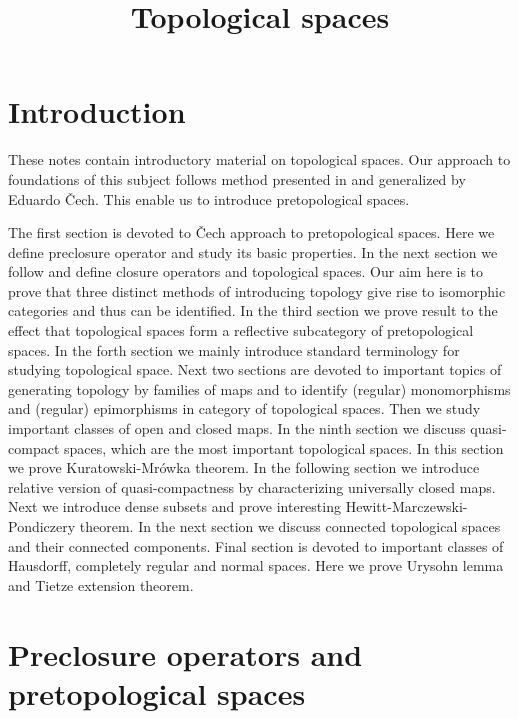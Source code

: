 



\title{Topological spaces}
\date{}
\maketitle

\section{Introduction}
\noindent
These notes contain introductory material on topological spaces. Our approach to foundations of this subject follows method presented in \cite{kuratowski1922operation} and generalized by Eduardo \v{C}ech. This enable us to introduce pretopological spaces.

The first section is devoted to \v{C}ech approach to pretopological spaces. Here we define preclosure operator and study its basic properties. In the next section we follow \cite{kuratowski1922operation} and define closure operators and topological spaces. Our aim here is to prove that three distinct methods of introducing topology give rise to isomorphic categories and thus can be identified. In the third section we prove result to the effect that topological spaces form a reflective subcategory of pretopological spaces. In the forth section we mainly introduce standard terminology for studying topological space. Next two sections are devoted to important topics of generating topology by families of maps and to identify (regular) monomorphisms and (regular) epimorphisms in category of topological spaces. Then we study important classes of open and closed maps. In the ninth section we discuss quasi-compact spaces, which are the most important topological spaces. In this section we prove Kuratowski-Mrówka theorem. In the following section we introduce relative version of quasi-compactness by characterizing universally closed maps. Next we introduce dense subsets and prove interesting Hewitt-Marczewski-Pondiczery theorem. In the next section we discuss connected topological spaces and their connected components. Final section is devoted to important classes of Hausdorff, completely regular and normal spaces. Here we prove Urysohn lemma and Tietze extension theorem. 

\section{Preclosure operators and pretopological spaces}

